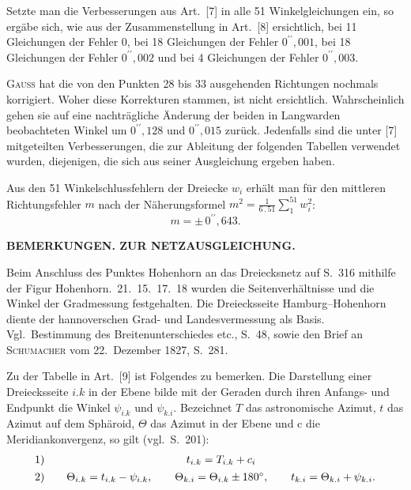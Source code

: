 \par\noindent\hspace*{\parindent}Setzte man die Verbesserungen aus Art.~[7] in alle 51 Winkelgleichungen
ein, so ergäbe sich, wie aus der Zusammenstellung in Art.~[8] ersichtlich,
bei 11 Gleichungen der Fehler $0$, bei 18 Gleichungen der Fehler
$0^{\prime\prime}{,}001$, bei 18 Gleichungen der Fehler $0^{\prime\prime}{,}002$
und bei 4 Gleichungen der Fehler $0^{\prime\prime}{,}003$.

\par\noindent\hspace*{\parindent}\textsc{Gauss} hat die von den Punkten 28 bis 33 ausgehenden Richtungen
nochmals korrigiert. Woher diese Korrekturen stammen, ist nicht ersichtlich.
Wahrscheinlich gehen sie auf eine nachträgliche Änderung der beiden in
Langwarden beobachteten Winkel um $0^{\prime\prime}{,}128$ und
$0^{\prime\prime}{,}015$ zurück. Jedenfalls sind die unter [7] mitgeteilten
Verbesserungen, die zur Ableitung der folgenden Tabellen verwendet wurden,
diejenigen, die sich aus seiner Ausgleichung ergeben haben.

\par\noindent\hspace*{\parindent}Aus den 51 Winkelschlussfehlern der Dreiecke $w_i$ erhält man für den mittleren
Richtungsfehler $m$ nach der Näherungsformel
$\displaystyle m^2=\frac{1}{6\mathbin{.}51}\sum_{1}^{51}w_i^2$:
\[
m=\pm\,0^{\prime\prime}{,}643.
\]

\clearpage
{}\hfill\textbf{BEMERKUNGEN. ZUR NETZAUSGLEICHUNG.}
\par\medskip

\par\noindent\hspace*{\parindent}Beim Anschluss des Punktes Hohenhorn an das Dreiecksnetz auf S.~316
mithilfe der Figur Hohenhorn.~21.~15.~17.~18 wurden die Seitenverhältnisse
und die Winkel der Gradmessung festgehalten. Die Dreiecksseite
Hamburg--Hohenhorn diente der hannoverschen Grad- und Landesvermessung
als Basis. Vgl.~Bestimmung des Breitenunterschiedes etc., S.~48, sowie
den Brief an \textsc{Schumacher} vom 22.~Dezember 1827, S.~281.

\par\noindent\hspace*{\parindent}Zu der Tabelle in Art.~[9] ist Folgendes zu bemerken. Die Darstellung
einer Dreiecksseite $i.k$ in der Ebene bilde mit der Geraden durch ihren
Anfangs- und Endpunkt die Winkel $\psi_{i.k}$ und $\psi_{k.i}$. Bezeichnet
$T$ das astronomische Azimut, $t$ das Azimut auf dem Sphäroid, $\Theta$
das Azimut in der Ebene und $\mathrm{c}$ die Meridiankonvergenz, so gilt
(vgl.~S.~201):
\[
\begin{array}{r@{\qquad}c}
1)&t_{i.k}=T_{i.k}+c_i\\[4pt]
2)&\Theta_{i.k}=t_{i.k}-\psi_{i.k},\qquad
\Theta_{k.i}=\Theta_{i.k}\pm180^\circ,\qquad
t_{k.i}=\Theta_{k.i}+\psi_{k.i}.
\end{array}
\]

